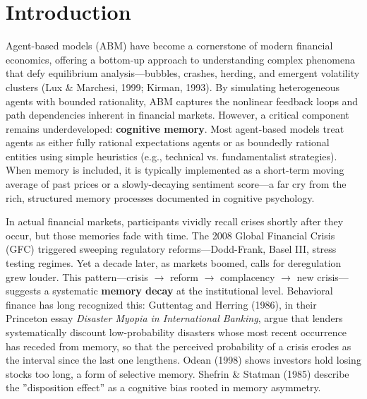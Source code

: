 \documentclass[11pt]{article}
\begin{document}
\section{Introduction}
Agent-based models (ABM) have become a cornerstone of modern financial economics, offering a bottom-up approach to understanding complex phenomena that defy equilibrium analysis---bubbles, crashes, herding, and emergent volatility clusters (Lux \& Marchesi, 1999; Kirman, 1993). By simulating heterogeneous agents with bounded rationality, ABM captures the nonlinear feedback loops and path dependencies inherent in financial markets. However, a critical component remains underdeveloped: \textbf{cognitive memory}. Most agent-based models treat agents as either fully rational expectations agents or as boundedly rational entities using simple heuristics (e.g., technical vs. fundamentalist strategies). When memory is included, it is typically implemented as a short-term moving average of past prices or a slowly-decaying sentiment score---a far cry from the rich, structured memory processes documented in cognitive psychology.

In actual financial markets, participants vividly recall crises shortly after they occur, but those memories fade with time. The 2008 Global Financial Crisis (GFC) triggered sweeping regulatory reforms---Dodd-Frank, Basel III, stress testing regimes. Yet a decade later, as markets boomed, calls for deregulation grew louder. This pattern---crisis $\rightarrow$ reform $\rightarrow$ complacency $\rightarrow$ new crisis---suggests a systematic \textbf{memory decay} at the institutional level. Behavioral finance has long recognized this: Guttentag and Herring (1986), in their Princeton essay \textit{Disaster Myopia in International Banking}, argue that lenders systematically discount low-probability disasters whose most recent occurrence has receded from memory, so that the perceived probability of a crisis erodes as the interval since the last one lengthens. Odean (1998) shows investors hold losing stocks too long, a form of selective memory. Shefrin \& Statman (1985) describe the ''disposition effect'' as a cognitive bias rooted in memory asymmetry.
\end{document}
